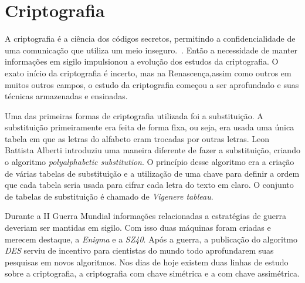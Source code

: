 \chapter{Criptografia}
\label{cryptograhy}

%
A criptografia é a ciência dos códigos secretos, permitindo a confidencialidade de uma comunicação que utiliza um meio inseguro.~\cite{vauldenay}. Então a necessidade de manter informações em sigilo impulsionou a evolução dos estudos da criptografia. O exato início da criptografia é incerto, mas na Renascença,assim como outros em muitos outros campos, o estudo da criptografia começou a ser aprofundado e suas técnicas armazenadas e ensinadas. \cite{donald-davies}

%
Uma das primeiras formas de criptografia utilizada foi a substituição. A substituição primeiramente era feita de forma fixa, ou seja, era usada uma única tabela em que as letras do alfabeto eram trocadas por outras letras. Leon Battista Alberti introduziu uma maneira diferente de fazer a substituição, criando o algoritmo \textit{polyalphabetic substitution}. O princípio desse algoritmo era a criação de várias tabelas de substituição e a utilização de uma chave para definir a ordem que cada tabela seria usada para cifrar cada letra do texto em claro. O conjunto de tabelas de substituição é chamado de \textit{Vigenere tableau}.

%
Durante a II Guerra Mundial informações relacionadas a estratégias de guerra deveriam ser mantidas em sigilo. Com isso duas máquinas foram criadas e merecem destaque, a \textit{Enigma} e a \textit{SZ40}. Após a guerra, a publicação do algoritmo \textit{DES} serviu de incentivo para cientistas do mundo todo aprofundarem suas pesquisas em novos algoritmos. Nos dias de hoje existem duas linhas de estudo sobre a criptografia, a criptografia com chave simétrica e a com chave assimétrica. 

